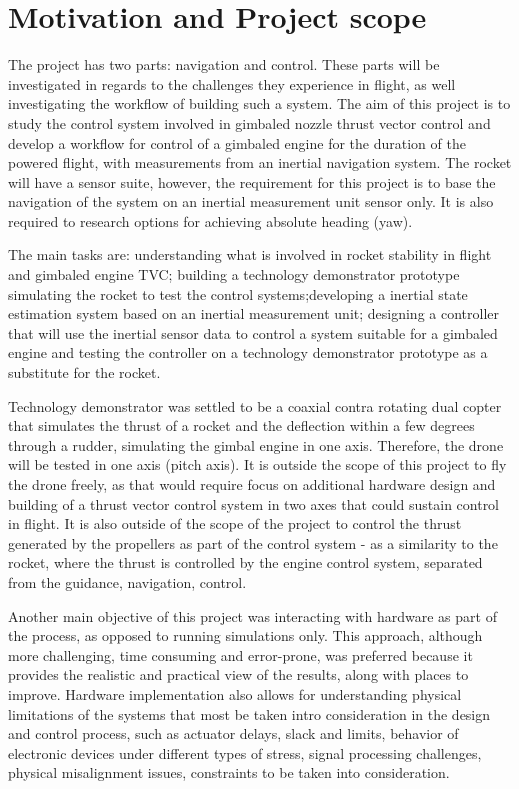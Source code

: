\section{Motivation and Project scope}

The project has two parts: navigation and control. These parts will be investigated in regards to the challenges they experience in flight, as well investigating the workflow of building such a system.
The aim of this project is to study the control system involved in gimbaled nozzle thrust vector control and develop a workflow for control of a gimbaled engine for the duration of the powered flight, with measurements from an inertial navigation system. The rocket will have a sensor suite, however, the requirement for this project is to base the navigation of the system on an inertial measurement unit sensor only. It is also required to research options for achieving absolute heading (yaw). 

The main tasks are: understanding what is involved in rocket stability in flight and gimbaled engine TVC; building a technology demonstrator prototype simulating the rocket to test the control systems;developing a inertial state estimation system based on an inertial measurement unit; designing a controller that will use the inertial sensor data to control a system suitable for a gimbaled engine and testing the controller on a technology demonstrator prototype as a substitute for the rocket. 

Technology demonstrator was settled to be a coaxial contra rotating dual copter that simulates the thrust of a rocket and the deflection within a few degrees through a rudder, simulating the gimbal engine in one axis. Therefore, the drone will be tested in one axis (pitch axis). It is outside the scope of this project to fly the drone freely, as that would require focus on additional hardware design and building of a thrust vector control system in two axes that could sustain control in flight. It is also outside of the scope of the project to control the thrust generated by the propellers as part of the control system - as a similarity to the rocket, where the thrust is controlled by the engine control system, separated from the guidance, navigation, control. 

Another main objective of this project was interacting with hardware as part of the process, as opposed to running simulations only. This approach, although more challenging, time consuming and error-prone,  was preferred because it provides the realistic and practical view of the results, along with places to improve. Hardware implementation also allows for understanding physical limitations of the systems that most be taken intro consideration in the design and control process, such as actuator delays, slack and limits, behavior of electronic devices under different types of stress, signal processing challenges, physical misalignment issues, constraints to be taken into consideration. 

